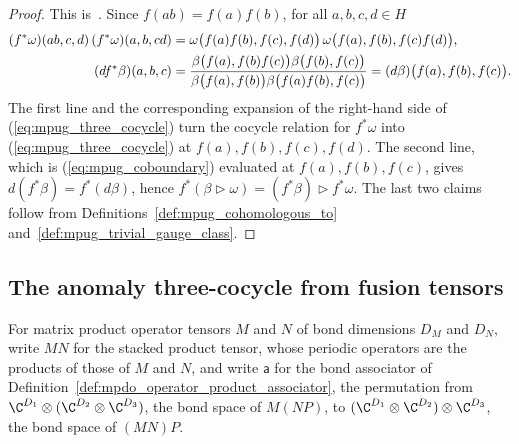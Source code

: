 \begin{proof}\leanok
    This is~\cite[``Restriction preserves cocycles and gauge
        classes'']{QICLean2026Blueprint}.
    Since $f(ab)=f(a)f(b)$, for all $a,b,c,d\in H$
    \begin{align}
        (f^*\omega)(ab,c,d)\,(f^*\omega)(a,b,cd)
         & =\omega\bigl(f(a)f(b),f(c),f(d)\bigr)\,
        \omega\bigl(f(a),f(b),f(c)f(d)\bigr),
        \notag                                                              \\
        (d f^*\beta)(a,b,c)
         & =\frac{\beta\bigl(f(a),f(b)f(c)\bigr)\beta\bigl(f(b),f(c)\bigr)}
        {\beta\bigl(f(a),f(b)\bigr)\beta\bigl(f(a)f(b),f(c)\bigr)}
        =(d\beta)\bigl(f(a),f(b),f(c)\bigr).
        \notag
    \end{align}
    The first line and the corresponding expansion of the right-hand side
    of (\ref{eq:mpug_three_cocycle}) turn the cocycle relation for $f^*\omega$
    into (\ref{eq:mpug_three_cocycle}) at $f(a),f(b),f(c),f(d)$. The second
    line, which is (\ref{eq:mpug_coboundary}) evaluated at $f(a),f(b),f(c)$,
    gives $d(f^*\beta)=f^*(d\beta)$, hence
    $f^*(\beta\mathbin{\triangleright}\omega)
        =(f^*\beta)\mathbin{\triangleright}f^*\omega$. The last two claims
    follow from Definitions~\ref{def:mpug_cohomologous_to}
    and~\ref{def:mpug_trivial_gauge_class}.
\end{proof}

\subsection{The anomaly three-cocycle from fusion tensors}

For matrix product operator tensors $M$ and $N$ of bond dimensions $D_M$
and $D_N$, write $MN$ for the stacked product tensor, whose periodic operators
are the products of those of $M$ and $N$, and write $\mathsf a$ for the
bond associator of Definition~\ref{def:mpdo_operator_product_associator},
the permutation from $\C^{D_1}\otimes(\C^{D_2}\otimes\C^{D_3})$, the bond
space of $M(NP)$, to $(\C^{D_1}\otimes\C^{D_2})\otimes\C^{D_3}$, the bond
space of $(MN)P$.

